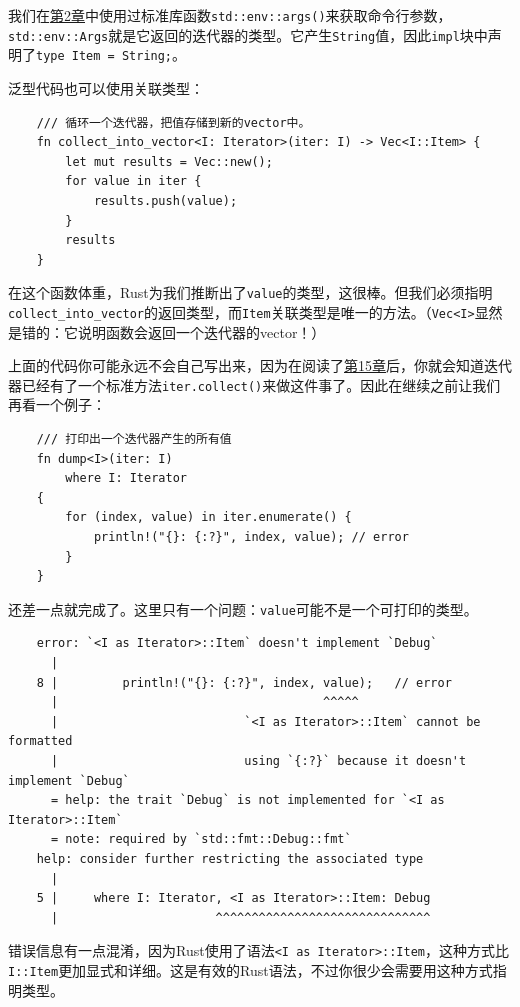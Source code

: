 我们在\hyperref[ch02]{第2章}中使用过标准库函数\texttt{std::env::args()}来获取命令行参数，\texttt{std::env::Args}就是它返回的迭代器的类型。它产生\texttt{String}值，因此\texttt{impl}块中声明了\texttt{type Item = String;}。

泛型代码也可以使用关联类型：
\begin{verbatim}
    /// 循环一个迭代器，把值存储到新的vector中。
    fn collect_into_vector<I: Iterator>(iter: I) -> Vec<I::Item> {
        let mut results = Vec::new();
        for value in iter {
            results.push(value);
        }
        results
    }
\end{verbatim}

在这个函数体重，Rust为我们推断出了\texttt{value}的类型，这很棒。但我们必须指明\texttt{collect\_into\_vector}的返回类型，而\texttt{Item}关联类型是唯一的方法。（\texttt{Vec<I>}显然是错的：它说明函数会返回一个迭代器的vector！）

上面的代码你可能永远不会自己写出来，因为在阅读了\hyperref[ch15]{第15章}后，你就会知道迭代器已经有了一个标准方法\texttt{iter.collect()}来做这件事了。因此在继续之前让我们再看一个例子：
\begin{verbatim}
    /// 打印出一个迭代器产生的所有值
    fn dump<I>(iter: I)
        where I: Iterator
    {
        for (index, value) in iter.enumerate() {
            println!("{}: {:?}", index, value); // error
        }
    }
\end{verbatim}

还差一点就完成了。这里只有一个问题：\texttt{value}可能不是一个可打印的类型。
\begin{verbatim}
    error: `<I as Iterator>::Item` doesn't implement `Debug`
      |
    8 |         println!("{}: {:?}", index, value);   // error
      |                                     ^^^^^
      |                          `<I as Iterator>::Item` cannot be formatted
      |                          using `{:?}` because it doesn't implement `Debug`
      = help: the trait `Debug` is not implemented for `<I as Iterator>::Item`
      = note: required by `std::fmt::Debug::fmt`
    help: consider further restricting the associated type
      |
    5 |     where I: Iterator, <I as Iterator>::Item: Debug
      |                      ^^^^^^^^^^^^^^^^^^^^^^^^^^^^^^
\end{verbatim}

错误信息有一点混淆，因为Rust使用了语法\texttt{<I as Iterator>::Item}，这种方式比\texttt{I::Item}更加显式和详细。这是有效的Rust语法，不过你很少会需要用这种方式指明类型。

